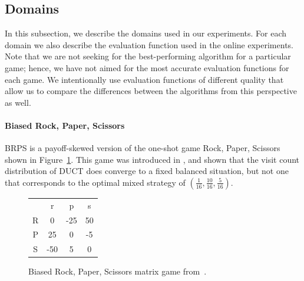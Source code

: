 \subsection{Domains}\label{sec:eval:domains}
In this subsection, we describe the domains used in our experiments.
For each domain we also describe the evaluation function used in the online experiments. 
Note that we are not seeking for the best-performing algorithm for a particular game; hence, we have not aimed for the most accurate evaluation functions for each game.
We intentionally use evaluation functions of different quality that allow us to compare the differences between the algorithms from this perspective as well.

\paragraph{\textbf{Biased Rock, Paper, Scissors}} 
BRPS is a payoff-skewed version of the one-shot game Rock, Paper, Scissors shown in 
Figure~\ref{fig:brps}. This game was introduced in \cite{Shafiei09}, and shown that the visit count distribution of 
DUCT does converge to a fixed balanced situation, but not one that 
corresponds to the optimal mixed strategy of $(\frac{1}{16},\frac{10}{16},\frac{5}{16})$. 

\begin{figure}[h!]
\begin{center}
\begin{tabular}{c|c|c|c|}
 \multicolumn{1}{c}{~} & \multicolumn{1}{c}{r}  &  \multicolumn{1}{c}{p} &  \multicolumn{1}{c}{s}\\\cline{2-4}
R &  0  & -25& 50\\\cline{2-4}
P &  25 &  0 & -5\\\cline{2-4}
S & -50 &  5 &  0\\\cline{2-4}
\end{tabular}
\end{center}
\caption{Biased Rock, Paper, Scissors matrix game from~\cite{Shafiei09}. \label{fig:brps}}
\end{figure}


